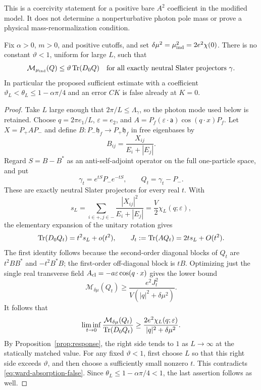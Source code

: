 This is a coercivity statement for a positive bare $A^2$ coefficient in the
modified model.  It does not determine a nonperturbative photon pole mass
or prove a physical mass-renormalization condition.

\begin{proposition}
\label{prop:ward-absorption-false}
Fix $\alpha>0$, $m>0$, and positive cutoffs, and set
$\delta\mu^2=\mu_{\rm ind}^2=2e^2\chi(0)$.
There is no constant $\vartheta<1$, uniform for large $L$, such that
\begin{equation}
 \mathcal M_{\mu_{\rm ind}}(Q)
 \le\vartheta\operatorname{Tr}(D_0Q)
 \quad\text{for all exactly neutral Slater projectors }\gamma.
 \label{eq:ward-absorption-false}
\end{equation}
In particular the proposed sufficient estimate with a coefficient
$\vartheta_L<\theta_L\le1-\alpha\pi/4$ and an error $CK$ is false already
at $K=0$.
\end{proposition}
\begin{proof}
Take $L$ large enough that $2\pi/L\le\Lambda_\gamma$, so the photon mode
used below is retained. Choose $q=2\pi e_1/L$, $\varepsilon=e_2$, and
$A=P_f(\varepsilon\cdot\boldsymbol{\mathsf a})\cos(q\cdot x)P_f$.
Let $X=P_+AP_-$ and define $B:P_-\mathfrak h_f\to P_+\mathfrak h_f$ in
free eigenbases by
\[
 B_{ij}=\frac{X_{ij}}{E_i+|E_j|}.
\]
Regard $S=B-B^*$ as an anti-self-adjoint operator on the full one-particle
space, and put
\[
 \gamma_t=e^{tS}P_-e^{-tS},\qquad Q_t=\gamma_t-P_-.
\]
These are exactly neutral Slater projectors for every real $t$.
With
\[
 s_L=\sum_{i\in+,j\in-}\frac{|X_{ij}|^2}{E_i+|E_j|}
     =\frac V2\chi_L(q;\varepsilon),
\]
the elementary expansion of the unitary rotation gives
\[
 \operatorname{Tr}(D_0Q_t)=t^2s_L+o(t^2),\qquad
 J_t:=\operatorname{Tr}(AQ_t)=2ts_L+O(t^2).
\]
The first identity follows because the second-order diagonal blocks of
$Q_t$ are $t^2BB^*$ and $-t^2B^*B$; the first-order off-diagonal block is
$tB$.  Optimizing just the single real transverse field
$A_{\rm cl}=-a\varepsilon\cos(q\cdot x)$ gives the lower bound
\[
 \mathcal M_{\delta\mu}(Q_t)
 \ge\frac{e^2J_t^2}{V(|q|^2+\delta\mu^2)}.
\]
It follows that
\begin{equation}
 \liminf_{t\to0}
 \frac{\mathcal M_{\delta\mu}(Q_t)}{\operatorname{Tr}(D_0Q_t)}
 \ge\frac{2e^2\chi_L(q;\varepsilon)}{|q|^2+\delta\mu^2}.
 \label{eq:ward-ratio}
\end{equation}
By Proposition~\ref{prop:response}, the right side tends to $1$ as
$L\to\infty$ at the statically matched value.  For any fixed $\vartheta<1$, first
choose $L$ so that this right side exceeds $\vartheta$, and then choose a
sufficiently small nonzero $t$.  This contradicts
\eqref{eq:ward-absorption-false}.  Since
$\theta_L\le1-\alpha\pi/4<1$, the last assertion follows as well.
\end{proof}

